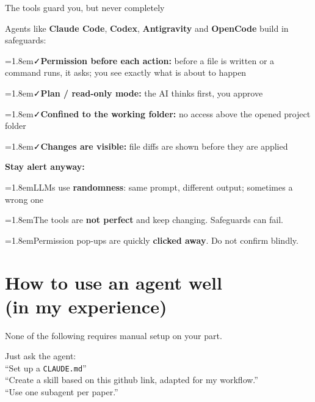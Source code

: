 \documentclass[aspectratio=169, 11pt, t]{beamer}
\newcommand{\yes}{\textcolor{seeblau}{\faCheck}}
\newcommand{\warn}{\textcolor{akzentrot}{\faExclamationTriangle}}
\newcommand{\hint}[2]{\par\noindent\hangindent=1.8em\hangafter=1\textcolor{seeblau}{#1}\quad #2\par}
\begin{document}
\begin{frame}{The tools guard you, but never completely}

\small
Agents like \textbf{Claude Code}, \textbf{Codex}, \textbf{Antigravity} and \textbf{OpenCode} build in safeguards:\\[0.6em]
\hint{\yes}{\textbf{Permission before each action:} before a file is written or a command runs, it asks; you see exactly what is about to happen}
\hint{\yes}{\textbf{Plan / read-only mode:} the AI thinks first, you approve}
\hint{\yes}{\textbf{Confined to the working folder:} no access above the opened project folder}
\hint{\yes}{\textbf{Changes are visible:} file diffs are shown before they are applied}
\vfill
\textbf{Stay alert anyway:}\\[0.3em]
\hint{\warn}{LLMs use \textbf{randomness}: same prompt, different output; sometimes a wrong one}
\hint{\warn}{The tools are \textbf{not perfect} and keep changing. Safeguards can fail.}
\hint{\warn}{Permission pop-ups are quickly \textbf{clicked away}. Do not confirm blindly.}

\end{frame}


\section{How to use an agent well \\ (in my experience)}

\begin{frame}[standout]
  \vfill
  {\large None of the following requires manual setup on your part.}

  \vspace{1.2em}
  \normalsize
  Just ask the agent:\\[0.6em]
  \enquote{Set up a \texttt{CLAUDE.md}} \\
  \enquote{Create a skill based on this github link, adapted for my workflow.} \\
  \enquote{Use one subagent per paper.}
  \vfill
\end{frame}
\end{document}
